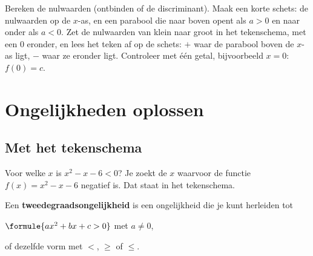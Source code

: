 \begin{werkwijze}
Bereken de nulwaarden (ontbinden of de discriminant). Maak een korte schets: de nulwaarden op de $x$-as, en een parabool die naar boven opent als $a > 0$ en naar onder als $a < 0$. Zet de nulwaarden van klein naar groot in het tekenschema, met een $0$ eronder, en lees het teken af op de schets: $+$ waar de parabool boven de $x$-as ligt, $-$ waar ze eronder ligt. Controleer met één getal, bijvoorbeeld $x = 0$: $f(0) = c$.
\end{werkwijze}

\begin{oefeningen}
\end{oefeningen}

\section{Ongelijkheden oplossen}

\subsection{Met het tekenschema}

Voor welke $x$ is $x^2 - x - 6 < 0$? Je zoekt de $x$ waarvoor de functie $f(x) = x^2 - x - 6$ negatief is. Dat staat in het tekenschema.

\begin{theorie}
Een \textbf{\textcolor{accent}{tweedegraadsongelijkheid}} is een ongelijkheid die je kunt herleiden tot

\qquad $\formule{ax^2 + bx + c > 0}$ \qquad met $a \neq 0$,

of dezelfde vorm met $<$, $\geqslant$ of $\leqslant$.
\end{theorie}


